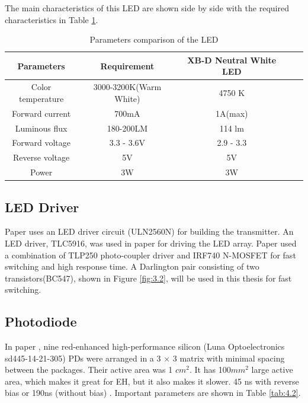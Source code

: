The main characteristics of this LED are shown side by side with the required characteristics in Table \ref{tab:4.1}.

\begin{table}
    \centering
    \caption{Parameters comparison of the LED}
    \begin{tabular}{|c|c|c|c|c|}
         \hline
         \textbf{Parameters} &\textbf{Requirement}  &
         XB-D Neutral White LED\\
         \hline
         Color temperature  &3000-3200K(Warm White) &4750 K\\
         \hline
         Forward current  &700mA  &1A(max)\\
         \hline
         Luminous flux  &180-200LM &114 lm \\
         \hline
         Forward voltage &3.3 - 3.6V  &2.9 - 3.3 \\
         \hline
         Reverse voltage  &5V   &5V\\
         \hline
         Power &3W   &3W\\
         \hline

    \end{tabular}
    \label{tab:4.1}
\end{table}


\subsection{LED Driver}
Paper \cite{thongsa2018design} uses an LED driver circuit (ULN2560N) for building the transmitter. An LED driver, TLC5916, was used in paper \cite{6757172} for driving the LED array. Paper \cite{7420990} used a combination of TLP250 photo-coupler driver and IRF740 N-MOSFET for fast switching and high response time. A Darlington pair consisting of two transistors(BC547), shown in Figure \ref{fig:3.2}, will be used in this thesis for fast switching.


\subsection{Photodiode}
In paper \cite{de2024reconfigurable}, nine red-enhanced high-performance silicon (Luna Optoelectronics sd445-14-21-305) PDs were arranged in a 3 × 3 matrix with minimal spacing between the packages. Their active area was 1 \(cm^{2}\). It has 100\(mm^{2}\) large active area, which makes it great for \ac{EH}, but it also makes it slower. 45 ns with reverse bias or 190ns (without bias)  \cite{passion}. Important parameters are shown in Table \ref{tab:4.2}.

